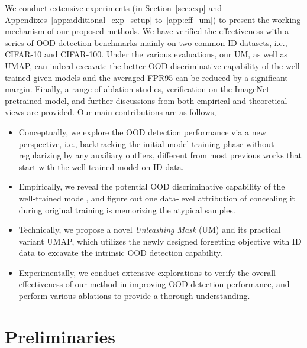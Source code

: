 \documentclass{article}
\theoremstyle{plain}
\theoremstyle{definition}
\theoremstyle{remark}
\begin{document}
We conduct extensive experiments (in Section~\ref{sec:exp} and Appendixes~\ref{app:additional_exp_setup} to~\ref{app:eff_um}) to present the working mechanism of our proposed methods. We have verified the effectiveness with a series of OOD detection benchmarks mainly on two common ID datasets, i.e., CIFAR-10 and CIFAR-100. Under the various evaluations, our UM, as well as UMAP, can indeed excavate the better OOD discriminative capability of the well-trained given models and the averaged FPR95 can be reduced by a significant margin. Finally, a range of ablation studies, verification on the ImageNet pretrained model, and further discussions from both empirical and theoretical views are provided. Our main contributions are as follows,
\begin{itemize}
    \item Conceptually, we explore the OOD detection performance via a new perspective, i.e., backtracking the initial model training phase without regularizing by any auxiliary outliers, different from most previous works that start with the well-trained model on ID data.
    \item Empirically, we reveal the potential OOD discriminative capability of the well-trained model, and figure out one data-level attribution of concealing it during original training is memorizing the atypical samples.
    \item Technically, we propose a novel \textit{Unleashing Mask} (UM) and its practical variant UMAP, which utilizes the newly designed forgetting objective with ID data to excavate the intrinsic OOD detection capability. 
\item Experimentally, we conduct extensive explorations to verify the overall effectiveness of our method in improving OOD detection performance, and perform various ablations to provide a thorough understanding. \end{itemize}






\section{Preliminaries}
\end{document}
